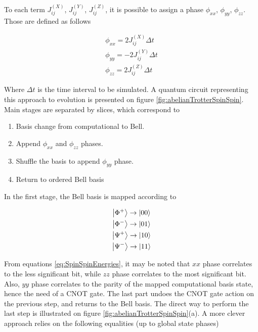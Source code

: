   To each term $J_{ij}^{(X)}$, $J_{ij}^{(Y)}$, $J_{ij}^{(Z)}$, it is possible to assign a phase $\phi_{xx}$, $\phi_{yy}$, $\phi_{zz}$. Those are defined as follows

  \begin{gather}
    \phi_{xx} = 2 J_{ij}^{(X)} \Delta t \\
    \phi_{yy} = -2 J_{ij}^{(Y)} \Delta t \\
    \phi_{zz} = 2 J_{ij}^{(Z)} \Delta t
    \label{eq:SpinSpinPhases}
  \end{gather}
  
  Where $\Delta t$ is the time interval to be simulated. A quantum circuit representing this approach to evolution is presented on figure \ref{fig:abelianTrotterSpinSpin}. Main stages are separated by slices, which correspond to

  \begin{enumerate}
    \item Basis change from computational to Bell.
    \item Append $\phi_{xx}$ and $\phi_{zz}$ phases.
    \item Shuffle the basis to append $\phi_{yy}$ phase.
    \item Return to ordered Bell basis
  \end{enumerate}

  In the first stage, the Bell basis is mapped according to

  \begin{gather}
    \ket{\Phi^{+}} \rightarrow \ket{00} \\
    \ket{\Phi^{-}} \rightarrow \ket{01} \\
    \ket{\Psi^{+}} \rightarrow \ket{10} \\
    \ket{\Psi^{-}} \rightarrow \ket{11} 
  \end{gather}

  From equations \ref{eq:SpinSpinEnergies}, it may be noted that $xx$ phase correlates to the less significant bit, while $zz$ phase correlates to the most significant bit. Also, $yy$ phase correlates to the parity of the mapped computational basis state, hence the need of a CNOT gate. The last part undoes the CNOT gate action on the previous step, and returns to the Bell basis. The direct way to perform the last step is illustrated on figure \ref{fig:abelianTrotterSpinSpin}(a). A more clever approach relies on the following equalities (up to global state phases)

